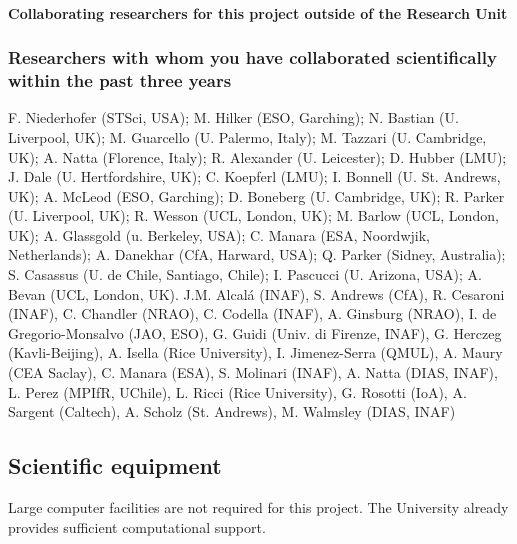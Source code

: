\documentclass[10pt,fleqn,twoside,a4paper]{article}
\begin{document}
\paragraph{Collaborating researchers for this project outside of
  the Research Unit}


\subsubsection{Researchers with whom you have collaborated scientifically within the past three years}

F. Niederhofer (STSci, USA); M. Hilker (ESO, Garching); N. Bastian (U. Liverpool,
UK); M. Guarcello (U. Palermo, Italy); M. Tazzari (U. Cambridge, UK);
A. Natta (Florence, Italy); R. Alexander (U. Leicester); D. Hubber
(LMU); J. Dale (U. Hertfordshire, UK); C. Koepferl (LMU); I. Bonnell
(U. St. Andrews, UK); A. McLeod (ESO, Garching); D. Boneberg
(U. Cambridge, UK); R. Parker (U. Liverpool, UK); R. Wesson (UCL,
London, UK); M. Barlow (UCL, London, UK); A. Glassgold (u. Berkeley,
USA); C. Manara (ESA, Noordwjik, Netherlands); A. Danekhar (CfA,
Harward, USA); Q. Parker (Sidney, Australia); S. Casassus
(U. de Chile, Santiago, Chile); I. Pascucci (U. Arizona, USA);
A. Bevan (UCL, London, UK).
J.M. Alcal\'a (INAF), S. Andrews (CfA), R. Cesaroni (INAF),
C. Chandler (NRAO), C. Codella (INAF), A. Ginsburg (NRAO), I. de
Gregorio-Monsalvo (JAO, ESO), G. Guidi (Univ. di Firenze, INAF),
G. Herczeg (Kavli-Beijing), A. Isella (Rice University),
I. Jimenez-Serra (QMUL), A. Maury (CEA Saclay), C. Manara (ESA),
S. Molinari (INAF), A. Natta (DIAS, INAF), L. Perez (MPIfR, UChile),
L. Ricci (Rice University), G. Rosotti (IoA), A. Sargent (Caltech),
A. Scholz (St. Andrews), M. Walmsley (DIAS, INAF)

\subsection{Scientific equipment}

Large computer facilities are not required for this project. The
University already provides sufficient computational support. 
\end{document}
